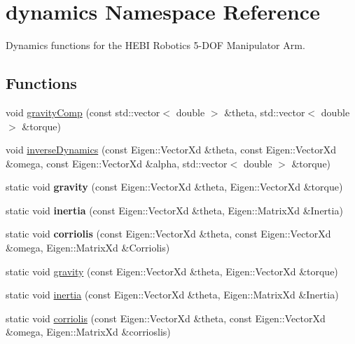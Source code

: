 \hypertarget{namespacedynamics}{}\section{dynamics Namespace Reference}
\label{namespacedynamics}


Dynamics functions for the H\+E\+BI Robotics 5-\/\+D\+OF Manipulator Arm.  


\subsection*{Functions}
\begin{DoxyCompactItemize}
\item 
void \hyperlink{namespacedynamics_a00e914433e77671dac03be0ca7d34e1f}{gravity\+Comp} (const std\+::vector$<$ double $>$ \&theta, std\+::vector$<$ double $>$ \&torque)
\item 
void \hyperlink{namespacedynamics_a6f9761c4fbb20c590cfb1ae345e2ff61}{inverse\+Dynamics} (const Eigen\+::\+Vector\+Xd \&theta, const Eigen\+::\+Vector\+Xd \&omega, const Eigen\+::\+Vector\+Xd \&alpha, std\+::vector$<$ double $>$ \&torque)
\item 
\mbox{\label{namespacedynamics_a826b52a5f1fc2dd61ea69a771c8eec94}} 
static void {\bfseries gravity} (const Eigen\+::\+Vector\+Xd \&theta, Eigen\+::\+Vector\+Xd \&torque)
\item 
\mbox{\label{namespacedynamics_a9fc7ae178c0d08f46bd2b18dd86d36ae}} 
static void {\bfseries inertia} (const Eigen\+::\+Vector\+Xd \&theta, Eigen\+::\+Matrix\+Xd \&Inertia)
\item 
\mbox{\label{namespacedynamics_a64347919700ac9a683912de6f2b141fb}} 
static void {\bfseries corriolis} (const Eigen\+::\+Vector\+Xd \&theta, const Eigen\+::\+Vector\+Xd \&omega, Eigen\+::\+Matrix\+Xd \&Corriolis)
\item 
static void \hyperlink{namespacedynamics_a826b52a5f1fc2dd61ea69a771c8eec94}{gravity} (const Eigen\+::\+Vector\+Xd \&theta, Eigen\+::\+Vector\+Xd \&torque)
\item 
static void \hyperlink{namespacedynamics_a9fc7ae178c0d08f46bd2b18dd86d36ae}{inertia} (const Eigen\+::\+Vector\+Xd \&theta, Eigen\+::\+Matrix\+Xd \&Inertia)
\item 
static void \hyperlink{namespacedynamics_a09facde2bbc78b9a537aa3b03fffec5f}{corriolis} (const Eigen\+::\+Vector\+Xd \&theta, const Eigen\+::\+Vector\+Xd \&omega, Eigen\+::\+Matrix\+Xd \&corrioslis)
\end{DoxyCompactItemize}


